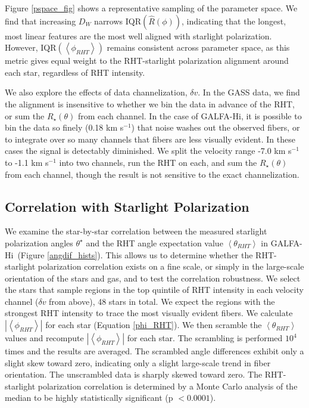 \documentclass[12pt]{emulateapj}
\newcommand{\hi}{H{\sc i}~}
\newcommand{\hia}{H{\sc i}}
\begin{document}
Figure \ref{pspace_fig} shows a representative sampling of the parameter space. We find that increasing $D_W$ narrows IQR${({\hat{R}\left(\phi\right)})}$, indicating that the longest, most linear features are the most well aligned with starlight polarization. However, IQR${\left(\left<\phi_{RHT} \right>\right)}$ remains consistent across parameter space, as this metric gives equal weight to the RHT-starlight polarization alignment around each star, regardless of RHT intensity. 

We also explore the effects of data channelization, $\delta v$. In the GASS data, we find the alignment is insensitive to whether we bin the data in advance of the RHT, or sum the $R_\star\left(\theta\right)$ from each channel. In the case of GALFA-\hia, it is possible to bin the data so finely (0.18 km s${^{-1}}$) that noise washes out the observed fibers, or to integrate over so many channels that fibers are less visually evident. In these cases the signal is detectably diminished. We split the velocity range -7.0 km s${^{-1}}$ to -1.1 km s${^{-1}}$ into two channels, run the RHT on each, and sum the $R_\star\left(\theta\right)$ from each channel, though the result is not sensitive to the exact channelization. 

\subsection{Correlation with Starlight Polarization}\label{corrstarpol}

We examine the star-by-star correlation between the measured starlight polarization angles $\theta^\star$ and the RHT angle expectation value $\left<\theta_{RHT}\right>$ in GALFA-\hi (Figure \ref{angdif_hists}). This allows us to determine whether the RHT-starlight polarization correlation exists on a fine scale, or simply in the large-scale orientation of the stars and gas, and to test the correlation robustness. We select the stars that sample regions in the top quintile of RHT intensity in each velocity channel ($\delta v$ from above), 48 stars in total. We expect the regions with the strongest RHT intensity to trace the most visually evident fibers. We calculate $\left|\left<\phi_{RHT}\right>\right|$ for each star (Equation \ref{phi_RHT}). We then scramble the $\left<\theta_{RHT}\right>$ values and recompute $\left|\left<\phi_{RHT}\right>\right|$ for each star. The scrambling is performed $10^4$ times and the results are averaged. The scrambled angle differences exhibit only a slight skew toward zero, indicating only a slight large-scale trend in fiber orientation. The unscrambled data is sharply skewed toward zero. The RHT-starlight polarization correlation is determined by a Monte Carlo analysis of the median to be highly statistically significant (p $< 0.0001$).
\end{document}
